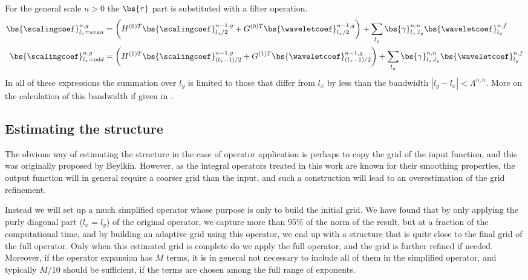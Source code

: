 For the general scale $n>0$ the $\bs{\tau}$ part is substituted with a
filter operation.
\begin{align}
    \begin{split}
    \bs{\scalingcoef}^{n,g}_{l_x=even} &= \bigg(H^{(0)T}
	\bs{\scalingcoef}^{n-1,g}_{l_x/2} +
	G^{(0)T}\bs{\waveletcoef}^{n-1,g}_{l_x/2}\bigg) + \sum_{l_y}
	\bs{\gamma}^{n,n}_{l_x,l_y}\bs{\waveletcoef}^{n,f}_{l_y}\\
    \bs{\scalingcoef}^{n,g}_{l_x=odd} &= \bigg(H^{(1)T}
	\bs{\scalingcoef}^{n-1,g}_{(l_x-1)/2} +
	G^{(1)T}\bs{\waveletcoef}^{n-1,g}_{(l_x-1)/2}\bigg) + \sum_{l_y}
	\bs{\gamma}^{n,n}_{l_x,l_y}\bs{\waveletcoef}^{n,f}_{l_y}
    \end{split}
\end{align}
In all of these expressions the summation over $l_y$ is limited to those that
differ from $l_x$ by less than the bandwidth $|l_y-l_x| < \Lambda^{n,n}$. More
on the calculation of this bandwidth if given in \cite{Fossgaard}.

\subsection{Estimating the \tree structure}
The obvious way of estimating the \tree structure in the case of operator
application is perhaps to copy the grid of the input function, and this
was originally proposed by Beylkin\cite{Beylkin}. However, as the integral
operators treated in this work are known for their smoothing properties, the
output function will in general require a coarser grid than the input, and such
a construction will lead to an overestimation of the grid refinement. 

Instead we 
will set up a much simplified operator whose purpose is only to build the initial 
grid. We have found that by only applying the purly diagonal part ($l_x = l_y$) 
of the original operator, we capture more than 95\% of the norm of the result, 
but at a fraction of the computational time, and by building an adaptive grid using
this operator, we end up with a \tree structure that is quite close to the final 
grid of the full operator. Only when this estimated grid is complete do we apply the
full operator, and the grid is further refined if needed. Moreover, if the operator
expansion has $M$ terms, it is in general not necessary to include all of
them in the simplified operator, and typically $M/10$ should be sufficient,
if the terms are chosen among the full range of exponents.
